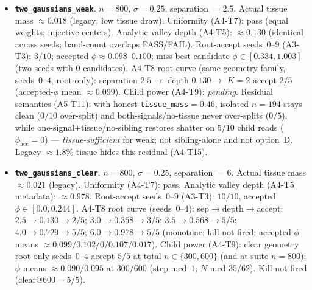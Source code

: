 \documentclass[11pt]{article}
\begin{document}
\begin{itemize}[leftmargin=1.2em]
  \item \textbf{\texttt{two\_gaussians\_weak}}.
  $n{=}800$, $\sigma{=}0.25$, separation ${=}2.5$.
  Actual tissue mass $\approx 0.018$ (legacy; low tissue draw).
  Uniformity (A4-T7): pass (equal weights; injective centers).
  Analytic valley depth (A4-T5): $\approx 0.130$ (identical across seeds;
  band-count overlaps PASS/FAIL).
  Root-accept seeds~$0$--$9$ (A3-T3): $3/10$;
  accepted $\phi\approx 0.098$--$0.100$;
  miss best-candidate $\phi\in[0.334,1.003]$ (two seeds with $0$
  candidates).
  A4-T8 root curve (same geometry family, seeds~$0$--$4$, root-only):
  separation $2.5\to$ depth $0.130\to$ $K{=}2$ accept $2/5$
  (accepted-$\phi$ mean $\approx 0.099$).
  Child power (A4-T9): \emph{pending}.
  Residual semantics (A5-T11): with honest
  \texttt{tissue\_mass}${=}0.46$, isolated $n{=}194$ stays clean
  ($0/10$ over-split) and both-signals/no-tissue never over-splits
  ($0/5$), while one-signal$+$tissue/no-sibling restores shatter on
  $5/10$ child reads ($\phi_{\mathrm{acc}}{=}0$) ---
  \emph{tissue-sufficient} for weak; not sibling-alone and not
  option~D. Legacy $\approx 1.8\%$ tissue hides this residual
  (A4-T15).

  \item \textbf{\texttt{two\_gaussians\_clear}}.
  $n{=}800$, $\sigma{=}0.25$, separation ${=}6$.
  Actual tissue mass $\approx 0.021$ (legacy).
  Uniformity (A4-T7): pass.
  Analytic valley depth (A4-T5 metadata): $\approx 0.978$.
  Root-accept seeds~$0$--$9$ (A3-T3): $10/10$,
  accepted $\phi\in[0.0,0.244]$.
  A4-T8 root curve (seeds~$0$--$4$):
  sep$\to$depth$\to$accept:
  $2.5{\to}0.130{\to}2/5$;
  $3.0{\to}0.358{\to}3/5$;
  $3.5{\to}0.568{\to}5/5$;
  $4.0{\to}0.729{\to}5/5$;
  $6.0{\to}0.978{\to}5/5$
  (monotone; kill not fired; accepted-$\phi$ means
  $\approx 0.099/0.102/0/0.107/0.017$).
  Child power (A4-T9): clear geometry root-only seeds~$0$--$4$
  accept $5/5$ at total $n{\in}\{300,600\}$ (and at suite $n{=}800$);
  $\phi$ means $\approx 0.090/0.095$ at $300/600$ (step med~$1$;
  $N$ med $35/62$). Kill not fired (clear@$600{=}5/5$).


\end{itemize}
\end{document}
